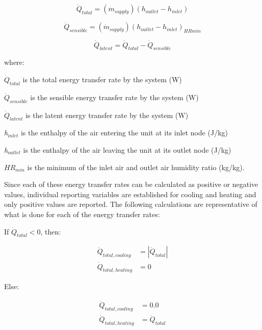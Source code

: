 \begin{equation}
{\dot Q_{total}} = ({\dot m_{supply}})({h_{outlet}} - {h_{inlet}})
\end{equation}

\begin{equation}
{\dot Q_{sensible}} = ({\dot m_{supply}}){({h_{outlet}} - {h_{inlet}})_{HRmin}}
\end{equation}

\begin{equation}
{\dot Q_{latent}} = {\dot Q_{total}} - {\dot Q_{sensible}}
\end{equation}

where:

\(\dot{Q}_{total}\) is the total energy transfer rate by the system (W)

\(\dot{Q}_{sensible}\) is the sensible energy transfer rate by the system (W)

\(\dot{Q}_{latent}\) is the latent energy transfer rate by the system (W)

\emph{h\(_{inlet}\)} is the enthalpy of the air entering the unit at its inlet node (J/kg)

\emph{h\(_{outlet}\)} is the enthalpy of the air leaving the unit at its outlet node (J/kg)

\(H{R_{min}}\) is the minimum of the inlet air and outlet air humidity ratio (kg/kg).

Since each of these energy transfer rates can be calculated as positive or negative values, individual reporting variables are established for cooling and heating and only positive values are reported. The following calculations are representative of what is done for each of the energy transfer rates:

If $\dot{Q}_{total}<0$, then:

\begin{equation}
  \begin{array}{rl}
    \dot{Q}_{total,cooling} &= \left|\dot{Q}_{total}\right| \\
    \dot{Q}_{total,heating} &= 0
  \end{array}
\end{equation}

Else:

\begin{equation}
  \begin{array}{rl}
    \dot{Q}_{total,cooling} &= 0.0 \\
    \dot{Q}_{total,heating} &= \dot{Q}_{total}
  \end{array}
\end{equation}

